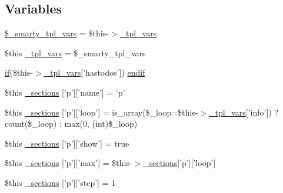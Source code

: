 \subsection*{\-Variables}
\begin{DoxyCompactItemize}
\item 
\hyperlink{_06_06-72_05_06_06-727729411_05left__frame_8tpl_8php_a14dde6d029d65a879ee7bc1ebc398dd1}{\$\-\_\-smarty\-\_\-tpl\-\_\-vars} = \$this-\/$>$\hyperlink{_06_06127_05_06_0612781687_05pkgelementindex_8tpl_8php_a4a4846d8e68d455590131a05697f67a3}{\-\_\-tpl\-\_\-vars}
\item 
\$this \hyperlink{_06_06-72_05_06_06-727729411_05left__frame_8tpl_8php_a4a4846d8e68d455590131a05697f67a3}{\-\_\-tpl\-\_\-vars} = \$\-\_\-smarty\-\_\-tpl\-\_\-vars
\item 
\hyperlink{_setup_8inc_8php_ad0184337b31d13763ec8751feff4aabe}{if}(\$this-\/$>$\hyperlink{_06_06127_05_06_0612781687_05pkgelementindex_8tpl_8php_a4a4846d8e68d455590131a05697f67a3}{\-\_\-tpl\-\_\-vars}\mbox{[}'hastodos'\mbox{]}) \hyperlink{_06_06-72_05_06_06-727729411_05left__frame_8tpl_8php_a82cd33ca97ff99f2fcc5e9c81d65251b}{endif}
\item 
\$this \hyperlink{_06_06-72_05_06_06-727729411_05left__frame_8tpl_8php_ac23b0b1d4f3c081e87a726b494bf863e}{\-\_\-sections} \mbox{[}'p'\mbox{]}\mbox{[}'name'\mbox{]} = 'p'
\item 
\$this \hyperlink{_06_06-72_05_06_06-727729411_05left__frame_8tpl_8php_acf112e73369b5d57a5dd5027c069ef61}{\-\_\-sections} \mbox{[}'p'\mbox{]}\mbox{[}'loop'\mbox{]} = is\-\_\-array(\$\-\_\-loop=\$this-\/$>$\hyperlink{_06_06127_05_06_0612781687_05pkgelementindex_8tpl_8php_a4a4846d8e68d455590131a05697f67a3}{\-\_\-tpl\-\_\-vars}\mbox{[}'info'\mbox{]}) ? count(\$\-\_\-loop) \-: max(0, (int)\$\-\_\-loop)
\item 
\$this \hyperlink{_06_06-72_05_06_06-727729411_05left__frame_8tpl_8php_a59f101f9fd9747a4a1221916ee363795}{\-\_\-sections} \mbox{[}'p'\mbox{]}\mbox{[}'show'\mbox{]} = true
\item 
\$this \hyperlink{_06_06-72_05_06_06-727729411_05left__frame_8tpl_8php_ab9459d9765bffe6e71f98da075f4db9c}{\-\_\-sections} \mbox{[}'p'\mbox{]}\mbox{[}'max'\mbox{]} = \$this-\/$>$\hyperlink{_06_06127_05_06_0612781687_05pkgelementindex_8tpl_8php_a9e3d26b39edfe29c3f29b8035ef33828}{\-\_\-sections}\mbox{[}'p'\mbox{]}\mbox{[}'loop'\mbox{]}
\item 
\$this \hyperlink{_06_06-72_05_06_06-727729411_05left__frame_8tpl_8php_af0fe94b17f05601e226e298e84c30948}{\-\_\-sections} \mbox{[}'p'\mbox{]}\mbox{[}'step'\mbox{]} = 1

\end{DoxyCompactItemize}
